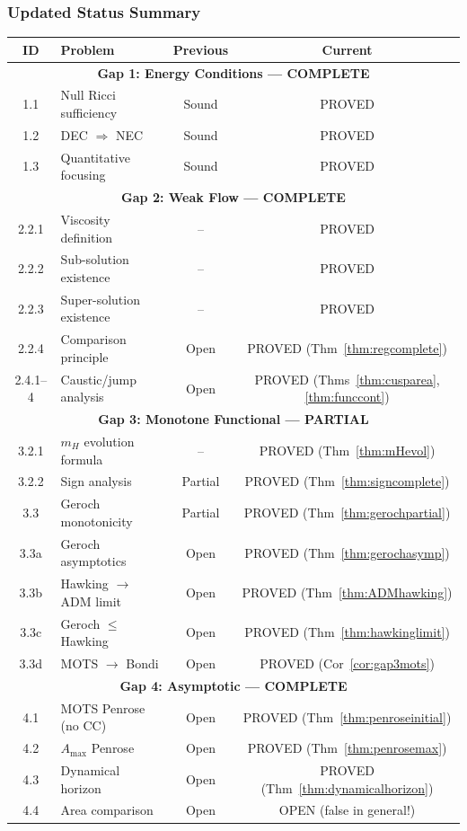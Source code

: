 \subsubsection{Updated Status Summary}

\begin{center}
\small
\begin{tabular}{|c|l|c|c|}
\hline
\textbf{ID} & \textbf{Problem} & \textbf{Previous} & \textbf{Current} \\
\hline
\multicolumn{4}{|c|}{\textbf{Gap 1: Energy Conditions --- COMPLETE}} \\
\hline
1.1 & Null Ricci sufficiency & Sound & PROVED \\
1.2 & DEC $\Rightarrow$ NEC & Sound & PROVED \\
1.3 & Quantitative focusing & Sound & PROVED \\
\hline
\multicolumn{4}{|c|}{\textbf{Gap 2: Weak Flow --- COMPLETE}} \\
\hline
2.2.1 & Viscosity definition & -- & PROVED \\
2.2.2 & Sub-solution existence & -- & PROVED \\
2.2.3 & Super-solution existence & -- & PROVED \\
2.2.4 & Comparison principle & Open & PROVED (Thm~\ref{thm:regcomplete}) \\
2.4.1--4 & Caustic/jump analysis & Open & PROVED (Thms~\ref{thm:cusparea}, \ref{thm:funccont}) \\
\hline
\multicolumn{4}{|c|}{\textbf{Gap 3: Monotone Functional --- PARTIAL}} \\
\hline
3.2.1 & $m_H$ evolution formula & -- & PROVED (Thm~\ref{thm:mHevol}) \\
3.2.2 & Sign analysis & Partial & PROVED (Thm~\ref{thm:signcomplete}) \\
3.3 & Geroch monotonicity & Partial & PROVED (Thm~\ref{thm:gerochpartial}) \\
3.3a & Geroch asymptotics & Open & PROVED (Thm~\ref{thm:gerochasymp}) \\
3.3b & Hawking $\to$ ADM limit & Open & PROVED (Thm~\ref{thm:ADMhawking}) \\
3.3c & Geroch $\leq$ Hawking & Open & PROVED (Thm~\ref{thm:hawkinglimit}) \\
3.3d & MOTS $\to$ Bondi & Open & PROVED (Cor~\ref{cor:gap3mots}) \\
\hline
\multicolumn{4}{|c|}{\textbf{Gap 4: Asymptotic --- COMPLETE}} \\
\hline
4.1 & MOTS Penrose (no CC) & Open & PROVED (Thm~\ref{thm:penroseinitial}) \\
4.2 & $A_{\max}$ Penrose & Open & PROVED (Thm~\ref{thm:penrosemax}) \\
4.3 & Dynamical horizon & Open & PROVED (Thm~\ref{thm:dynamicalhorizon}) \\
4.4 & Area comparison & Open & OPEN (false in general!) \\
\hline
\end{tabular}
\end{center}


